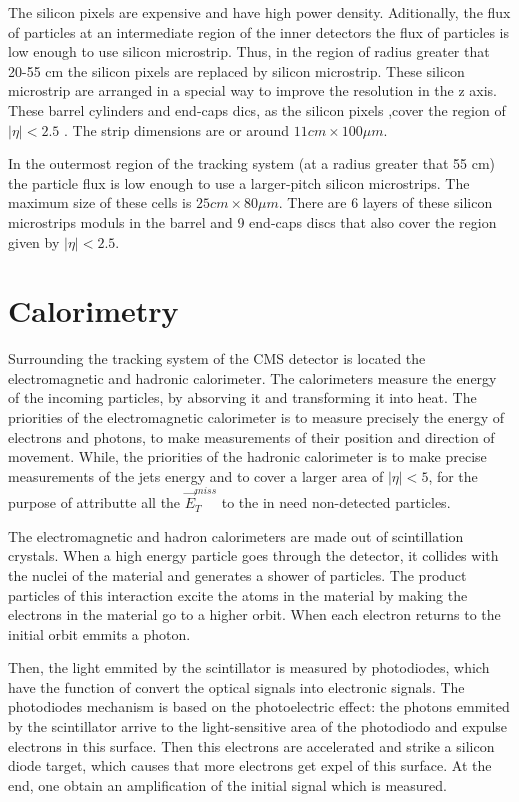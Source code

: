 The silicon pixels are expensive and have high power density. Aditionally, the flux of particles at an intermediate region of the inner detectors the flux of particles is low enough to use silicon microstrip. Thus, in the region of radius greater that 20-55 cm the silicon pixels are replaced by silicon microstrip. These silicon microstrip are arranged in a special way to improve the resolution in the z axis. These barrel cylinders and end-caps dics, as the silicon pixels ,cover the region of $|\eta| < 2.5$ . The strip dimensions are or around $11 cm \times 100 \mu m$.

In the outermost region of the tracking system (at a radius greater that 55 cm) the particle flux is low enough to use a larger-pitch silicon microstrips. The maximum size of these cells is $25cm \times 80 \mu m$. There are 6 layers of these silicon microstrips moduls in the barrel and 9 end-caps discs that also cover the region given by $|\eta|< 2.5$.


\section{Calorimetry}

Surrounding the tracking system of the CMS detector is located the electromagnetic and hadronic calorimeter. The calorimeters measure the energy of the incoming particles, by absorving it and transforming it into heat. The priorities of the electromagnetic calorimeter is to measure precisely the energy of electrons and photons, to make measurements of their position and direction of movement. While, the priorities of the hadronic calorimeter is to make precise measurements of the jets energy and to cover a larger area of $|\eta| < 5$, for the purpose of attributte all the $\vec{E}_T^{miss}$ to the in need non-detected particles. 

The electromagnetic and hadron calorimeters are made out of scintillation crystals. When a high energy particle goes through the detector, it collides with the nuclei of the material and generates a shower of particles. The product particles of this interaction excite the atoms in the material by making the electrons in the material go to a higher orbit. When each electron returns to the initial orbit emmits a photon. 

Then, the light emmited by the scintillator is measured by photodiodes, which have the function of convert the optical signals into electronic signals. The photodiodes mechanism is based on the photoelectric effect: the photons emmited by the scintillator arrive to the light-sensitive area of the photodiodo and expulse electrons in this surface. Then this electrons are accelerated and strike a silicon diode target, which causes that more electrons get expel of this surface. At the end, one obtain an amplification of the initial signal which is measured.

